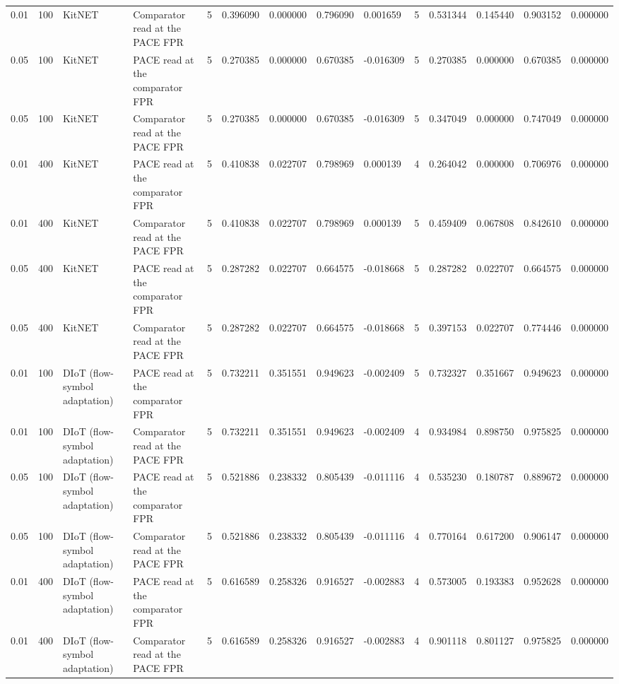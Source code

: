 \begin{tabular}{llllllllllllll}
0.01 & 100 & KitNET & Comparator read at the PACE FPR & 5 & 0.396090 & 0.000000 & 0.796090 & 0.001659 & 5 & 0.531344 & 0.145440 & 0.903152 & 0.000000 \\
0.05 & 100 & KitNET & PACE read at the comparator FPR & 5 & 0.270385 & 0.000000 & 0.670385 & -0.016309 & 5 & 0.270385 & 0.000000 & 0.670385 & 0.000000 \\
0.05 & 100 & KitNET & Comparator read at the PACE FPR & 5 & 0.270385 & 0.000000 & 0.670385 & -0.016309 & 5 & 0.347049 & 0.000000 & 0.747049 & 0.000000 \\
0.01 & 400 & KitNET & PACE read at the comparator FPR & 5 & 0.410838 & 0.022707 & 0.798969 & 0.000139 & 4 & 0.264042 & 0.000000 & 0.706976 & 0.000000 \\
0.01 & 400 & KitNET & Comparator read at the PACE FPR & 5 & 0.410838 & 0.022707 & 0.798969 & 0.000139 & 5 & 0.459409 & 0.067808 & 0.842610 & 0.000000 \\
0.05 & 400 & KitNET & PACE read at the comparator FPR & 5 & 0.287282 & 0.022707 & 0.664575 & -0.018668 & 5 & 0.287282 & 0.022707 & 0.664575 & 0.000000 \\
0.05 & 400 & KitNET & Comparator read at the PACE FPR & 5 & 0.287282 & 0.022707 & 0.664575 & -0.018668 & 5 & 0.397153 & 0.022707 & 0.774446 & 0.000000 \\
0.01 & 100 & DIoT (flow-symbol adaptation) & PACE read at the comparator FPR & 5 & 0.732211 & 0.351551 & 0.949623 & -0.002409 & 5 & 0.732327 & 0.351667 & 0.949623 & 0.000000 \\
0.01 & 100 & DIoT (flow-symbol adaptation) & Comparator read at the PACE FPR & 5 & 0.732211 & 0.351551 & 0.949623 & -0.002409 & 4 & 0.934984 & 0.898750 & 0.975825 & 0.000000 \\
0.05 & 100 & DIoT (flow-symbol adaptation) & PACE read at the comparator FPR & 5 & 0.521886 & 0.238332 & 0.805439 & -0.011116 & 4 & 0.535230 & 0.180787 & 0.889672 & 0.000000 \\
0.05 & 100 & DIoT (flow-symbol adaptation) & Comparator read at the PACE FPR & 5 & 0.521886 & 0.238332 & 0.805439 & -0.011116 & 4 & 0.770164 & 0.617200 & 0.906147 & 0.000000 \\
0.01 & 400 & DIoT (flow-symbol adaptation) & PACE read at the comparator FPR & 5 & 0.616589 & 0.258326 & 0.916527 & -0.002883 & 4 & 0.573005 & 0.193383 & 0.952628 & 0.000000 \\
0.01 & 400 & DIoT (flow-symbol adaptation) & Comparator read at the PACE FPR & 5 & 0.616589 & 0.258326 & 0.916527 & -0.002883 & 4 & 0.901118 & 0.801127 & 0.975825 & 0.000000 \\

\end{tabular}
